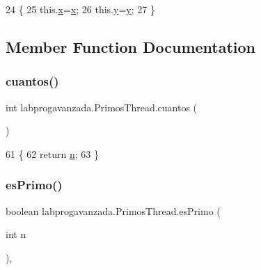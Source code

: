 \begin{DoxyCode}
24                                      \{
25         this.\mbox{\hyperlink{classlabprogavanzada_1_1_primos_thread_a32c2a35f28ba168dd13573c0b2987a35}{x}}=\mbox{\hyperlink{classlabprogavanzada_1_1_primos_thread_a32c2a35f28ba168dd13573c0b2987a35}{x}};
26         this.\mbox{\hyperlink{classlabprogavanzada_1_1_primos_thread_ab3a04e01f011379cec6e3448219ccd09}{y}}=\mbox{\hyperlink{classlabprogavanzada_1_1_primos_thread_ab3a04e01f011379cec6e3448219ccd09}{y}};
27     \}
\end{DoxyCode}


\subsection{Member Function Documentation}
\mbox{\label{classlabprogavanzada_1_1_primos_thread_af9a691ef3851f5fc2ee80277e56470c5}} 
\subsubsection{\texorpdfstring{cuantos()}{cuantos()}}
{\footnotesize\ttfamily int labprogavanzada.\+Primos\+Thread.\+cuantos (\begin{DoxyParamCaption}{ }\end{DoxyParamCaption})\hspace{0.3cm}{\ttfamily [inline]}}


\begin{DoxyCode}
61                         \{
62         \textcolor{keywordflow}{return} \mbox{\hyperlink{classlabprogavanzada_1_1_primos_thread_ae273c3f9736419431b182efcc4e1be3d}{n}};
63     \}
\end{DoxyCode}
\mbox{\label{classlabprogavanzada_1_1_primos_thread_a25df76b6f0e4824a861b0ca98b623d22}} 
\subsubsection{\texorpdfstring{es\+Primo()}{esPrimo()}}
{\footnotesize\ttfamily boolean labprogavanzada.\+Primos\+Thread.\+es\+Primo (\begin{DoxyParamCaption}\item[{int}]{n }\end{DoxyParamCaption})\hspace{0.3cm}{\ttfamily [inline]}, {\ttfamily [private]}}


